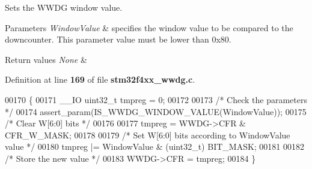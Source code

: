Sets the W\+W\+DG window value. 


\begin{DoxyParams}{Parameters}
{\em Window\+Value} & specifies the window value to be compared to the downcounter. This parameter value must be lower than 0x80. \\
\hline
\end{DoxyParams}

\begin{DoxyRetVals}{Return values}
{\em None} & \\
\hline
\end{DoxyRetVals}


Definition at line \textbf{ 169} of file \textbf{ stm32f4xx\+\_\+wwdg.\+c}.


\begin{DoxyCode}
00170 \{
00171   \_\_IO uint32\_t tmpreg = 0;
00172 
00173   \textcolor{comment}{/* Check the parameters */}
00174   assert_param(IS_WWDG_WINDOW_VALUE(WindowValue));
00175   \textcolor{comment}{/* Clear W[6:0] bits */}
00176 
00177   tmpreg = WWDG->CFR & CFR_W_MASK;
00178 
00179   \textcolor{comment}{/* Set W[6:0] bits according to WindowValue value */}
00180   tmpreg |= WindowValue & (uint32\_t) BIT_MASK;
00181 
00182   \textcolor{comment}{/* Store the new value */}
00183   WWDG->CFR = tmpreg;
00184 \}
\end{DoxyCode}
